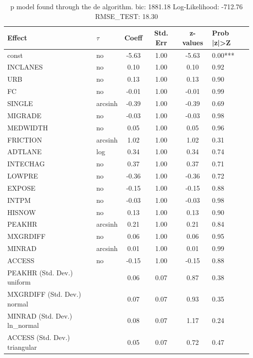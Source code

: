 \begin{table}
	\caption{p model found through the de algorithm. bic: 1881.18 Log-Likelihood: -712.76 RMSE_TEST: 18.30}
	\begin{center}
		\begin{tabular}{|l|l|c|c|c|l|}
			\hline
			Effect & $\tau$ & Coeff & Std. Err & z-values & Prob |z|>Z \\
			\hline
			const & no & -5.63 & 1.00 & -5.63 & 0.00*** \\
			\hline
			INCLANES & no & 0.10 & 1.00 & 0.10 & 0.92 \\
			\hline
			URB & no & 0.13 & 1.00 & 0.13 & 0.90 \\
			\hline
			FC & no & -0.01 & 1.00 & -0.01 & 0.99 \\
			\hline
			SINGLE & arcsinh & -0.39 & 1.00 & -0.39 & 0.69 \\
			\hline
			MIGRADE & no & -0.03 & 1.00 & -0.03 & 0.98 \\
			\hline
			MEDWIDTH & no & 0.05 & 1.00 & 0.05 & 0.96 \\
			\hline
			FRICTION & arcsinh & 1.02 & 1.00 & 1.02 & 0.31 \\
			\hline
			ADTLANE & log & 0.34 & 1.00 & 0.34 & 0.74 \\
			\hline
			INTECHAG & no & 0.37 & 1.00 & 0.37 & 0.71 \\
			\hline
			LOWPRE & no & -0.36 & 1.00 & -0.36 & 0.72 \\
			\hline
			EXPOSE & no & -0.15 & 1.00 & -0.15 & 0.88 \\
			\hline
			INTPM & no & -0.03 & 1.00 & -0.03 & 0.98 \\
			\hline
			HISNOW & no & 0.13 & 1.00 & 0.13 & 0.90 \\
			\hline
			PEAKHR & arcsinh & 0.21 & 1.00 & 0.21 & 0.84 \\
			\hline
			MXGRDIFF & no & 0.06 & 1.00 & 0.06 & 0.95 \\
			\hline
			MINRAD & arcsinh & 0.01 & 1.00 & 0.01 & 0.99 \\
			\hline
			ACCESS & no & -0.15 & 1.00 & -0.15 & 0.88 \\
			\hline
			PEAKHR (Std. Dev.) uniform &  & 0.06 & 0.07 & 0.87 & 0.38 \\
			\hline
			MXGRDIFF (Std. Dev.) normal &  & 0.07 & 0.07 & 0.93 & 0.35 \\
			\hline
			MINRAD (Std. Dev.) ln_normal &  & 0.08 & 0.07 & 1.17 & 0.24 \\
			\hline
			ACCESS (Std. Dev.) triangular &  & 0.05 & 0.07 & 0.72 & 0.47 \\
			\hline
		\end{tabular}
	\end{center}
\end{table}